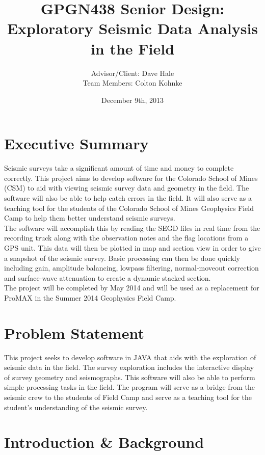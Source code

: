 \documentclass[11pt]{article}
\author{Advisor/Client: Dave Hale \\ Team Members: Colton Kohnke}
\title{GPGN438 Senior Design: \\ Exploratory Seismic Data Analysis in the Field}
\date{December 9th, 2013}
\begin{document}
\maketitle
\newpage

\tableofcontents
\listoffigures
\listoftables
\newpage

\section{Executive Summary}

Seismic surveys take a significant amount of time and money to complete correctly. This project aims to develop software for the Colorado School of Mines (CSM) to aid with viewing seismic survey data and geometry in the field. The software will also be able to help catch errors in the field. It will also serve as a teaching tool for the students of the Colorado School of Mines Geophysics Field Camp to help them better understand seismic surveys. \\

The software will accomplish this by reading the SEGD files in real time from the recording truck along with the observation notes and the flag locations from a GPS unit. This data will then be plotted in map and section view in order to give a snapshot of the seismic survey. Basic processing can then be done quickly including gain, amplitude balancing, lowpass filtering, normal-moveout correction and surface-wave attenuation to create a dynamic stacked section. \\

The project will be completed by May 2014 and will be used as a replacement for ProMAX in the Summer 2014 Geophysics Field Camp. 

\section{Problem Statement}

This project seeks to develop software in JAVA that aids with the exploration of seismic data in the field. The survey exploration includes the interactive display of survey geometry and seismographs. This software will also be able to perform simple processing tasks in the field. The program will serve as a bridge from the seismic crew to the students of Field Camp and serve as a teaching tool for the student's understanding of the seismic survey.

\section{Introduction \& Background}
\end{document}
